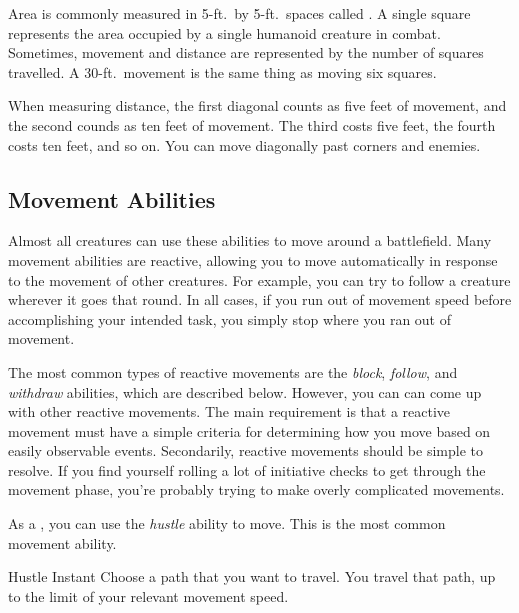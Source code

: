         \label{Squares} Area is commonly measured in 5-ft.\ by 5-ft.\ spaces called .
        A single square represents the area occupied by a single humanoid creature in combat.
        Sometimes, movement and distance are represented by the number of squares travelled.
        A 30-ft.\ movement is the same thing as moving six squares.

        \label{Diagonals} When measuring distance, the first diagonal counts as five feet of movement, and the second counds as ten feet of movement.
        The third costs five feet, the fourth costs ten feet, and so on.
        You can move diagonally past corners and enemies.

    \subsection{Movement Abilities}\label{Movement Abilities}

        Almost all creatures can use these abilities to move around a battlefield.
        Many movement abilities are reactive, allowing you to move automatically in response to the movement of other creatures.
        For example, you can try to follow a creature wherever it goes that round.
        In all cases, if you run out of movement speed before accomplishing your intended task, you simply stop where you ran out of movement.

        The most common types of reactive movements are the \textit{block}, \textit{follow}, and \textit{withdraw} abilities, which are described below.
        However, you can can come up with other reactive movements.
        The main requirement is that a reactive movement must have a simple criteria for determining how you move based on easily observable events.
        Secondarily, reactive movements should be simple to resolve.
        If you find yourself rolling a lot of initiative checks to get through the movement phase, you're probably trying to make overly complicated movements.

         As a , you can use the \textit{hustle} ability to move.
        This is the most common movement ability.

        \begin{instantability}{Hustle}
            \label{Hustle}
            Instant
            \rankline
            Choose a path that you want to travel.
            You travel that path, up to the limit of your relevant movement speed.
        \end{instantability}

